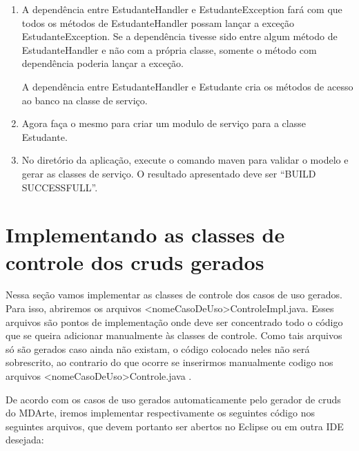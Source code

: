 \begin{enumerate}
\item A dependência entre EstudanteHandler e EstudanteException fará com que todos os métodos de EstudanteHandler possam lançar a exceção EstudanteException. Se a dependência tivesse sido entre algum método de EstudanteHandler e não com a própria classe, somente o método com dependência poderia lançar a exceção.

A dependência entre EstudanteHandler e Estudante cria os métodos de acesso ao banco na classe de serviço.

\item Agora faça o mesmo para criar um modulo de serviço para a classe Estudante.
	
\item No diretório da aplicação, execute o comando maven para validar o modelo
e gerar as classes de serviço. O resultado apresentado deve ser “BUILD
SUCCESSFULL”.
\end{enumerate}

\section{Implementando as classes de controle dos cruds gerados}
Nessa seção vamos implementar as classes de controle dos casos de uso gerados.
Para isso, abriremos os arquivos <nomeCasoDeUso>ControleImpl.java. Esses
arquivos são pontos de implementação onde deve ser concentrado todo o código que
se queira adicionar manualmente às classes de controle. Como tais arquivos só
são gerados caso ainda não existam, o código colocado neles não será
sobrescrito, ao contrario do que ocorre se inserirmos manualmente codigo nos
arquivos <nomeCasoDeUso>Controle.java .

De acordo com os casos de uso gerados automaticamente pelo gerador de cruds do
MDArte, iremos implementar respectivamente os seguintes código nos seguintes
arquivos, que devem portanto ser abertos no Eclipse ou em outra IDE desejada:

